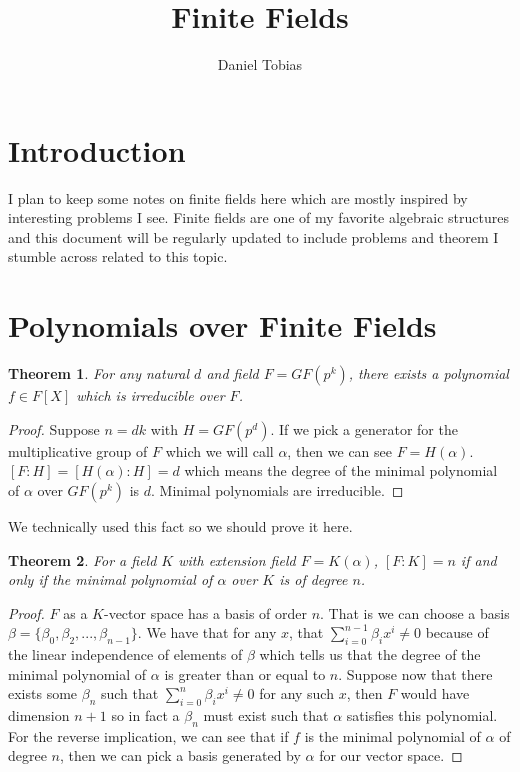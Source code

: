 \documentclass{article}
\title{Finite Fields}
\author{Daniel Tobias}
\date{}
\newtheorem{theorem}{Theorem}[section]
\begin{document}
\maketitle

\section{Introduction}
I plan to keep some notes on finite fields here which are mostly inspired by interesting problems I see. Finite fields are one of my favorite algebraic structures and this document will be regularly updated to include problems and theorem I stumble across related to this topic.

\section{Polynomials over Finite Fields}
\begin{theorem} For any natural $d$ and field $F = GF(p^{k})$, there exists a polynomial $f \in F[X]$ which is irreducible over $F$.
\end{theorem}
\begin{proof}Suppose $n = dk$ with $H = GF(p^{d})$. If we pick a generator for the multiplicative group of $F$ which we will call $\alpha$, then we can see $F = H(\alpha)$. $[F : H] = [H(\alpha) : H] = d$ which means the degree of the minimal polynomial of $\alpha$ over $GF(p^{k})$ is $d$. Minimal polynomials are irreducible.

\end{proof}

We technically used this fact so we should prove it here.
\begin{theorem}For a field $K$ with extension field $F = K(\alpha)$, $[F: K] = n$ if and only if the minimal polynomial of $\alpha$ over $K$ is of degree $n$.
\end{theorem}
\begin{proof} $F$ as a $K$-vector space has a basis of order $n$. That is we can choose a basis $\beta = \{\beta_{0}, \beta_{2},...,\beta_{n-1}\}$. We have that for any $x$, that $\sum_{i=0}^{n-1}\beta_{i}x^{i} \neq 0$ because of the linear independence of elements of $\beta$ which tells us that the degree of the minimal polynomial of $\alpha$ is greater than or equal to $n$. Suppose now that there exists some $\beta_{n}$ such that $\sum_{i=0}^{n} \beta_{i}x^{i} \neq 0$ for any such $x$, then $F$ would have dimension $n+1$ so in fact a $\beta_{n}$ must exist such that $\alpha$ satisfies this polynomial.\\

For the reverse implication, we can see that if $f$ is the minimal polynomial of $\alpha$ of degree $n$, then we can pick a basis generated by $\alpha$ for our vector space.
\end{proof}
\end{document}
